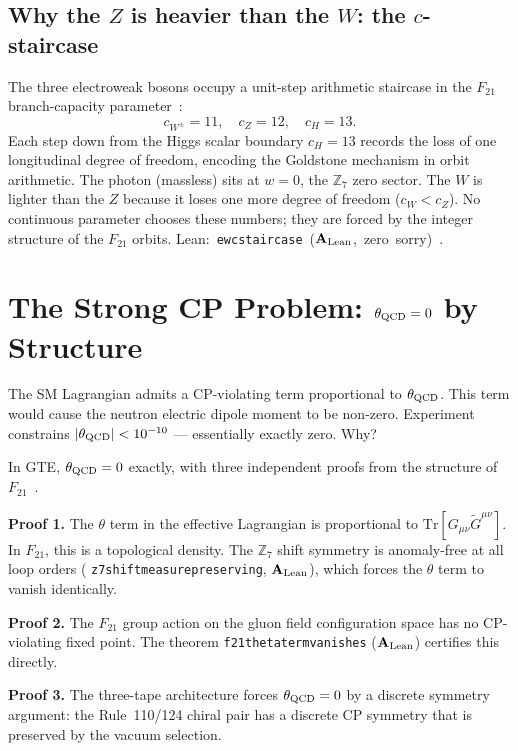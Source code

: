 \documentclass[11pt,a4paper]{article}
\newcommand{\lean}[1]{%
  \penalty-100
  \begingroup\def\_{\textunderscore\allowbreak}\texttt{#1}\endgroup}
\newcommand{\CatAL}{\ensuremath{\mathbf{A}_{\rm Lean}}}
\begin{document}
\subsection{Why the $Z$ is heavier than the $W$: the $c$-staircase}

The three electroweak bosons occupy a unit-step arithmetic staircase in the
$F_{21}$ branch-capacity parameter~\cite{SpivackGTECompleteFramework}:
\[
  c_{W^\pm} = 11, \quad c_Z = 12, \quad c_H = 13.
\]
Each step down from the Higgs scalar boundary $c_H = 13$ records the loss of
one longitudinal degree of freedom, encoding the Goldstone mechanism in
orbit arithmetic.
The photon (massless) sits at $w = 0$, the $\mathbb{Z}_7$ zero sector.
The $W$ is lighter than the $Z$ because it loses one more degree of freedom
($c_W < c_Z$).
No continuous parameter chooses these numbers; they are forced by the
integer structure of the $F_{21}$ orbits.
\mbox{Lean: \lean{ew\_c\_staircase} (\CatAL,\ zero sorry)}~\cite{SpivackGTECompleteFramework}.

\section{The Strong CP Problem: $\theta_{\rm QCD} = 0$ by Structure}
\label{sec:strongcp}

The SM Lagrangian admits a CP-violating term proportional to $\theta_{\rm QCD}$.
This term would cause the neutron electric dipole moment to be non-zero.
Experiment constrains $|\theta_{\rm QCD}| < 10^{-10}$ --- essentially exactly zero.
Why?

In GTE, $\theta_{\rm QCD} = 0$ exactly, with three independent proofs
from the structure of $F_{21}$~\cite{SpivackGTECompleteFramework}.

\textbf{Proof 1.} The $\theta$ term in the effective Lagrangian is proportional to
$\mathrm{Tr}[G_{\mu\nu} \tilde{G}^{\mu\nu}]$.
In $F_{21}$, this is a topological density.
The $\mathbb{Z}_7$ shift symmetry is anomaly-free at all loop orders
(\lean{z7\_shift\_measure\_preserving}, \CatAL), which forces the
$\theta$ term to vanish identically.

\textbf{Proof 2.} The $F_{21}$ group action on the gluon field configuration space
has no CP-violating fixed point.
The theorem \lean{f21\_theta\_term\_vanishes} (\CatAL) certifies this directly.

\textbf{Proof 3.} The three-tape architecture forces $\theta_{\rm QCD} = 0$ by
a discrete symmetry argument: the Rule~110/124 chiral pair has a discrete
CP symmetry that is preserved by the vacuum selection.
\end{document}
